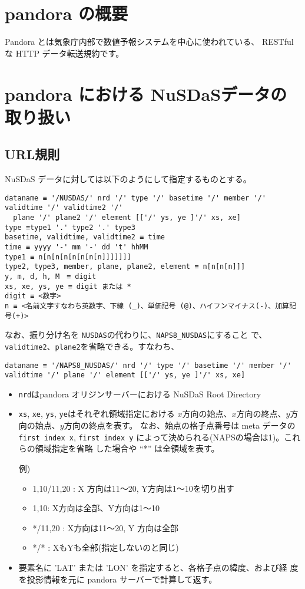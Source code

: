 \section{pandora の概要}

Pandora とは気象庁内部で数値予報システムを中心に使われている、
RESTful な HTTP データ転送規約です。

\section{pandora における NuSDaSデータの取り扱い}
\subsection{URL規則}\label{pandora_url}
NuSDaS データに対しては以下のようにして指定するものとする。
\begin{verbatim}
dataname ≡ '/NUSDAS/' nrd '/' type '/' basetime '/' member '/' validtime '/' validtime2 '/'
  plane '/' plane2 '/' element [['/' ys, ye ]'/' xs, xe]
type ≡type1 '.' type2 '.' type3
basetime, validtime, validtime2 ≡ time
time ≡ yyyy '-' mm '-' dd 't' hhMM
type1 ≡ n[n[n[n[n[n[n[n]]]]]]]
type2, type3, member, plane, plane2, element ≡ n[n[n[n]]]
y, m, d, h, M　≡ digit
xs, xe, ys, ye ≡ digit または *
digit ≡ <数字>
n ≡ <名前文字すなわち英数字、下線 (_)、単価記号 (@)、ハイフンマイナス(-)、加算記号(+)>
\end{verbatim}

なお、振り分け名を {\tt NUSDAS}の代わりに、{\tt NAPS8\_NUSDAS}にすること
で、{\tt validtime2}、{\tt plane2}を省略できる。すなわち、
\begin{verbatim}
dataname ≡ '/NAPS8_NUSDAS/' nrd '/' type '/' basetime '/' member '/'
validtime '/' plane '/' element [['/' ys, ye ]'/' xs, xe]
\end{verbatim}

\begin{itemize}
\item {\tt nrd}はpandora オリジンサーバーにおける NuSDaS Root Directory
\item {\tt xs}, {\tt xe}, {\tt ys}, {\tt ye}はそれぞれ領域指定における
      $x$方向の始点、$x$方向の終点、$y$方向の始点、$y$方向の終点を表す。
      なお、始点の格子点番号は meta データの{\tt first index x}, {\tt first
      index y} によって決められる(NAPSの場合は1)。これらの領域指定を省略
      した場合や ``*'' は全領域を表す。

      例)
      \begin{itemize}
       \item 1,10/11,20 : X 方向は11〜20, Y方向は1〜10を切り出す
       \item 1,10: X方向は全部、Y方向は1〜10
       \item */11,20 : X方向は11〜20, Y 方向は全部
       \item */* : XもYも全部(指定しないのと同じ)
      \end{itemize}
\item 要素名に 'LAT' または 'LON' を指定すると、各格子点の緯度、および経
      度を投影情報を元に pandora サーバーで計算して返す。

\end{itemize}


